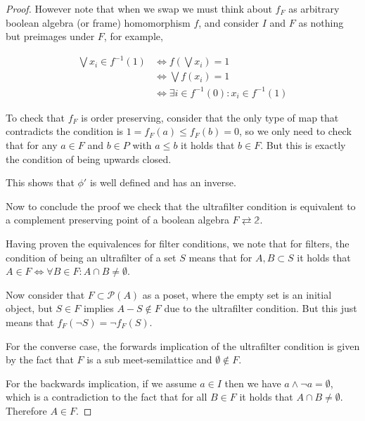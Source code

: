 \documentclass[12pt,a4paper]{article}
\begin{document}
\begin{proof}
However note that when we swap we must think about $f_F$ as arbitrary boolean algebra (or frame) homomorphism $f$, and consider $I$ and $F$ as nothing but preimages under $F$, for example,

\begin{align*}
	\bigvee x_i \in f^{-1}(1)&\iff f( \bigvee x_i) = 1 \\ 
	&\iff \bigvee f(x_i) = 1 \\
	&\iff \exists i \in f^{-1}(0) : x_i \in f^{-1}(1)
\end{align*}

To check that $f_F$ is order preserving, consider that the only type of map that contradicts the condition is $ 1 =f_F(a) \leq f_F(b) = 0$, so we only need to check that for any $a \in F$ and $b \in P$ with $a \leq b$ it holds that $b \in F$. But this is exactly the condition of being upwards closed. 

This shows that $\phi'$ is well defined and has an inverse. 

Now to conclude the proof we check that the ultrafilter condition is equivalent to a complement preserving point of a boolean algebra $F \rightleftarrows \mathbb{2}$.

Having proven the equivalences for filter conditions, we note that for filters, the condition of being an ultrafilter of a set $S$ means that for $A, B \subset S$ it holds that $A \in F \iff \forall B \in F: A \cap B \neq \emptyset $. 


 Now consider that $F \subset \mathcal{P}(A)$ as a poset, where the empty set is an initial object, but $S \in F$ implies $A - S \notin F$ due to the ultrafilter condition. But this just means that $f_F(\neg S) = \neg f_F(S)$. 
 
 For the converse case, the forwards implication of the ultrafilter condition is given by the fact that $F$ is a sub meet-semilattice and $\emptyset \notin F$. 
 
 
 
 
% 
% 
% 

For the backwards implication, if we assume $a \in I$ then we have $a \land \neg a = \emptyset $, which is a contradiction to the fact that for all $ B \in F$ it holds that $ A \cap B \neq \emptyset$. Therefore $A \in F$. \end{proof}
\end{document}

